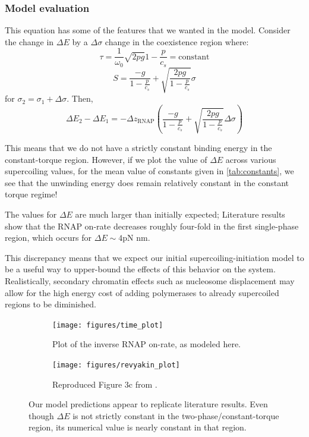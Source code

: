 \documentclass[11pt]{article}
\begin{document}
\FloatBarrier
\subsubsection{Model evaluation}
This equation has some of the features that we wanted in the model. Consider the change in \(\Delta E\) by a \(\Delta \sigma\) change in the coexistence region where:
\[\tau = \frac{1}{\omega_0} \sqrt{2pg}{1 - \frac{p}{c_s}} = \text{constant}\]
\[S = \frac{-g}{1 - \frac{p}{c_s}} + \sqrt{\frac{2pg}{1 - \frac{p}{c_s}}} \sigma\]
for \(\sigma_2 = \sigma_1 + \Delta \sigma\). Then,
\[\Delta E_2 - \Delta E_1 = - \Delta z_\text{RNAP} \left( \frac{-g}{1 - \frac{p}{c_s}} + \sqrt{\frac{2pg}{1-\frac{p}{c_s}}} \Delta \sigma\right)\]

This means that we do not have a strictly constant binding energy in the constant-torque region. However, if we plot the value of \(\Delta E\) across various supercoiling values, for the mean value of constants given in \autoref{tab:constants}, we see that the unwinding energy does remain relatively constant in the constant torque regime!

The values for \(\Delta E\) are much larger than initially expected; Literature results show that the RNAP on-rate decreases roughly four-fold in the first single-phase region, which occurs for \(\Delta E \sim 4 \text{pN nm}\). 

This discrepancy means that we expect our initial supercoiling-initiation model to be a useful way to upper-bound the effects of this behavior on the system. Realistically, secondary chromatin effects such as nucleosome displacement may allow for the high energy cost of adding polymerases to already supercoiled regions to be diminished.

\begin{figure}[h]
    \centering
    \begin{subfigure}{.49\linewidth}
        \centering
        \texttt{[image: figures/time\_plot]}
        \caption{Plot of the inverse RNAP on-rate, as modeled here.}
    \end{subfigure}
    \begin{subfigure}{.49\linewidth}
        \centering
        \texttt{[image: figures/revyakin\_plot]}
        \caption{Reproduced Figure 3c from \textcite{revyakinPromoterUnwindingPromoter2004}.}
    \end{subfigure}
    \caption{Our model predictions appear to replicate literature results. Even though \(\Delta E\) is not strictly constant in the two-phase/constant-torque region, its numerical value is nearly constant in that region.}
\end{figure}
\end{document}
